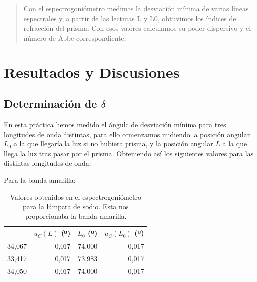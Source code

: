 \documentclass[10pt,onecolumn]{article}
\begin{document}

\tableofcontents %
\newpage

\HRule{0.5pt} %

\begin{abstract}
Con el espectrogoniómetro medimos la desviación mínima de varias líneas espectrales y, a partir de las lecturas L y L0, obtuvimos los índices de refracción del prisma. Con esos valores calculamos su poder dispersivo y el número de Abbe correspondiente.
\end{abstract}


\section{Resultados y Discusiones}
\subsection{Determinación de $\delta$}
En esta práctica hemos medido el ángulo de desviación mínima para tres longitudes de onda distintas, para ello
comenzamos midiendo la posición angular $L_0$ a la que llegaría la luz si no hubiera prisma,
y la posición angular $L$ a la que llega la luz tras pasar por el prisma. Obteniendo así los siguientes valores para las distintas longitudes de onda:

Para la banda amarilla:

\begin{table}[H]
\centering
\begin{tabular}{|r|r|r|r|}
\hline
\rowcolor[rgb]{ .651,  .788,  .925}
\multicolumn{1}{|l|}{$L$ (º)} & \multicolumn{1}{l|}{$u_C(L)$ (º)} & \multicolumn{1}{l|}{$L_0$ (º)} & \multicolumn{1}{l|}{$u_C(L_0)$ (º)} \\ \hline
\rowcolor[rgb]{.816,  .816,  .816} 34,067 & 0,017 & 74,000 & 0,017 \\ \hline
\rowcolor[rgb]{.816,  .816,  .816} 33,417 & 0,017 & 73,983 & 0,017 \\ \hline
\rowcolor[rgb]{.816,  .816,  .816} 34,050 & 0,017 & 74,000 & 0,017 \\ \hline
\end{tabular}
\caption{Valores obtenidos en el espectrogoniómetro para la lámpara de sodio. Esta nos proporcionaba la banda amarilla.}\label{tab:banda_amarilla}
\end{table}
\end{document}
